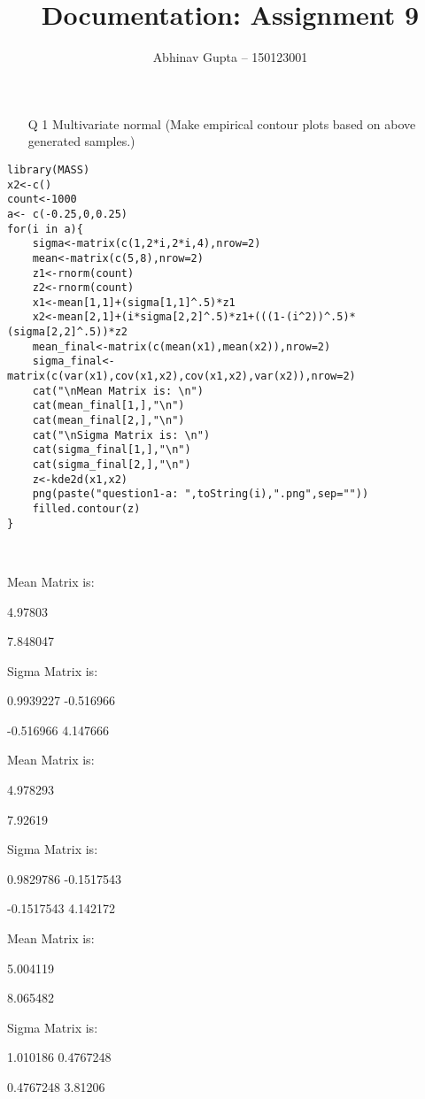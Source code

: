 \documentclass[11pt]{article}
\title{Documentation: Assignment 9}
\author{Abhinav Gupta -- 150123001}
\begin{document}
\titlepage
\newpage
\begin{enumerate}
\item[Q 1] Multivariate normal (Make empirical contour plots based on above generated samples.)
\end{enumerate}
\begin{lstlisting}
library(MASS)	
x2<-c()
count<-1000
a<- c(-0.25,0,0.25)
for(i in a){
	sigma<-matrix(c(1,2*i,2*i,4),nrow=2)
	mean<-matrix(c(5,8),nrow=2)
	z1<-rnorm(count)
	z2<-rnorm(count)
	x1<-mean[1,1]+(sigma[1,1]^.5)*z1
	x2<-mean[2,1]+(i*sigma[2,2]^.5)*z1+(((1-(i^2))^.5)*(sigma[2,2]^.5))*z2
	mean_final<-matrix(c(mean(x1),mean(x2)),nrow=2)
	sigma_final<-matrix(c(var(x1),cov(x1,x2),cov(x1,x2),var(x2)),nrow=2)
	cat("\nMean Matrix is: \n")
	cat(mean_final[1,],"\n")
	cat(mean_final[2,],"\n")
	cat("\nSigma Matrix is: \n")
	cat(sigma_final[1,],"\n")
	cat(sigma_final[2,],"\n")	
	z<-kde2d(x1,x2)
	png(paste("question1-a: ",toString(i),".png",sep=""))
	filled.contour(z)	
}

\end{lstlisting}
\

Mean Matrix is: \

4.97803 \

7.848047 \


Sigma Matrix is: \

0.9939227 -0.516966\
 
-0.516966 4.147666 \


Mean Matrix is: \

4.978293 \

7.92619 \


Sigma Matrix is: \

0.9829786 -0.1517543 \

-0.1517543 4.142172\
 

Mean Matrix is: \

5.004119 \

8.065482 \


Sigma Matrix is: \

1.010186 0.4767248 \

0.4767248 3.81206 \
\end{document}
